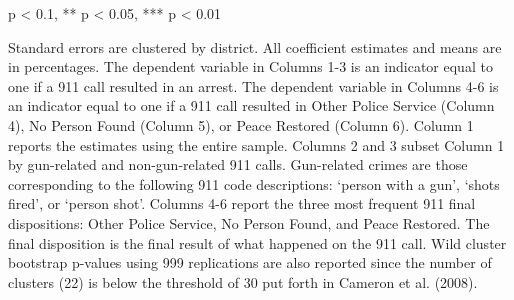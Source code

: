 \begin{table}[H]
\begin{threeparttable}
\begin{tablenotes}
\item * p < 0.1, ** p < 0.05, *** p < 0.01
\item Standard errors are clustered by district. All                      coefficient estimates and means are in percentages.                      The dependent variable in Columns 1-3 is an indicator equal to one if a 911 call resulted in an arrest.                      The dependent variable in Columns 4-6 is an indicator equal to one if a 911 call resulted in                       Other Police Service (Column 4), No Person Found (Column 5), or Peace Restored (Column 6).                      Column 1 reports the estimates using the entire sample.                  Columns 2 and 3 subset Column 1 by gun-related and non-gun-related 911 calls.                  Gun-related crimes are those corresponding to the following                  911 code descriptions: `person with a gun',                  `shots fired', or `person shot'.                   Columns 4-6 report the three most frequent 911 final dispositions: Other Police Service, No Person Found,                   and Peace Restored. The final disposition is the final result of                  what happened on the 911 call.                   Wild cluster bootstrap p-values using 999 replications are also reported                  since the number of clusters (22) is below the threshold of 30 put forth in                  Cameron et al. (2008).                  
\end{tablenotes}
\end{threeparttable}
\end{table}
